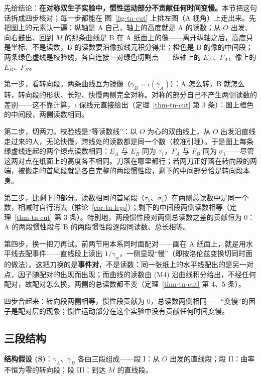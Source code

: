 \documentclass[
  chinese,
  a4paper,
  UTF8,
  12pt,
  oneside,
  openany]{ctexbook}
\theoremstyle{plain}
\theoremstyle{plain}
\theoremstyle{plain}
\theoremstyle{definition}
\theoremstyle{plain}
\theoremstyle{plain}
\theoremstyle{remark}
\begin{document}
先给结论：\textbf{在对称双生子实验中，惯性运动部分不贡献任何时间变慢。}本节把这句话拆成四步核对；每一步都能在
图~\ref{fig-tn-cut} 上排左图（A
视角）上走出来。先把图上的元素认一遍：纵轴是 A 自己，轴上的高度就是 A
的读数；从 \(O\) 出发、向右鼓出、回到 \(M\) 的那条曲线是 B 在 A
纸面上的像------离开纵轴之后，高度只是坐标、不是读数，B
的读数要沿像按线元积分得出；橙色是 B
的像的中间段；两条绿色虚线是校验线，各自连接一对绿色切割点------纵轴上的
\(E_A\)、\(F_A\)，像上的 \(E_B\)、\(F_B\)。

第一步，看转向段。两条曲线互为镜像（\(\gamma_B=\iota(\gamma_A)\)）：A
怎么转，B
就怎么转，转向段的形状、长短、快慢两侧完全对称。对称的部分自己不产生两侧读数的差别------这不靠计算，\(\iota\)
保线元直接给出（定理~\ref{thm-tn-cut} 第 3
条）：图上橙色的中间段，两侧读数相同。

第二步，切两刀。校验线是``等读数线''：以 \(O\) 为心的双曲线上，从 \(O\)
出发沿直线走过来的人，无论快慢，跨线处的读数都是同一个数（校准引理）。于是图上每条绿虚线连起的两个绿点读数相同：\(E_A\)
与 \(E_B\) 同为 \(\tau_1\)，\(F_A\) 与 \(F_B\) 同为
\(\sigma_1\)------尽管这两对点在纸面上的高度各不相同。刀落在哪里都行；若两刀正好落在转向段的两端，被搬走的首尾段就是各自完整的两段惯性段，剩下的中间部分恰是转向段本身。

第三步，比剩下的部分。读数相同的首尾段（\(\tau_1\)、\(\sigma_1\)）在两侧总读数中是同一个数，相减时自行消去（推论~\ref{cor-tn-legs}）；剩下的中间段两侧读数相等（定理~\ref{thm-tn-cut}
第 3 条）。特别地，两段惯性段对两侧总读数之差的贡献恒为 \(0\)：A
的两段惯性段与 B 的两段惯性段逐段同读数、总长相等。

第四步，换一把刀再试。前两节用本系同时面配对------画在 A
纸面上，就是用水平线去配事件------直线段上读出
\(1/\gamma_w\)，一侧显现``慢''（即按洛伦兹变换切同时面的做法）。这把刀换的是\textbf{事件对}，不是读数：同一张纸上的水平线配出的是另一对点，因子随配对的出现而出现；而曲线的读数由
(M4)
沿曲线积分给出，不经任何配对，故配对怎么换，两侧的总读数都不变（定理~\ref{thm-tn-cut}
第 4、5 条）。

四步合起来：转向段两侧相等，惯性段贡献为
\(0\)，总读数两侧相同------``变慢''的因子是配对层的现象；惯性运动部分在这个实验中没有贡献任何时间变慢。

\subsection{三段结构}\label{ux4e09ux6bb5ux7ed3ux6784}

\textbf{结构假设 (S)}：\(\gamma_A\)、\(\gamma_B\) 各由三段组成------段
I：从 \(O\) 出发的直线段；段 II：曲率不恒为零的转向段；段 III：到达
\(M\) 的直线段。
\end{document}
